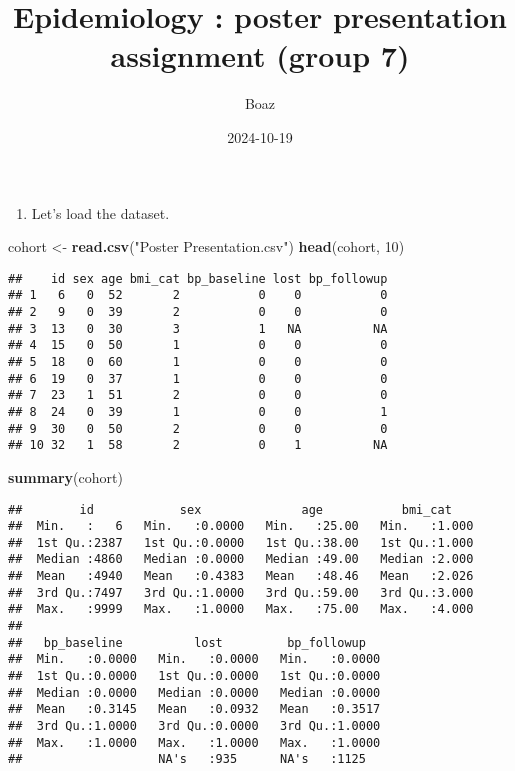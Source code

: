 \documentclass[
]{article}
\title{Epidemiology : poster presentation assignment (group 7)}
\author{Boaz}
\date{2024-10-19}
\newenvironment{Shaded}{\begin{snugshade}}{\end{snugshade}}
\newcommand{\DecValTok}[1]{\textcolor[rgb]{0.00,0.00,0.81}{#1}}
\newcommand{\FunctionTok}[1]{\textcolor[rgb]{0.13,0.29,0.53}{\textbf{#1}}}
\newcommand{\NormalTok}[1]{#1}
\newcommand{\OtherTok}[1]{\textcolor[rgb]{0.56,0.35,0.01}{#1}}
\newcommand{\StringTok}[1]{\textcolor[rgb]{0.31,0.60,0.02}{#1}}
\providecommand{\tightlist}{%
  \setlength{\itemsep}{0pt}\setlength{\parskip}{0pt}}
\begin{document}
\maketitle

\begin{enumerate}
\def\labelenumi{\arabic{enumi}.}
\tightlist
\item
  Let's load the dataset.
\end{enumerate}

\begin{Shaded}
\begin{Highlighting}[]
\NormalTok{cohort }\OtherTok{\textless{}{-}} \FunctionTok{read.csv}\NormalTok{(}\StringTok{"Poster Presentation.csv"}\NormalTok{)}
\FunctionTok{head}\NormalTok{(cohort, }\DecValTok{10}\NormalTok{)}
\end{Highlighting}
\end{Shaded}

\begin{verbatim}
##    id sex age bmi_cat bp_baseline lost bp_followup
## 1   6   0  52       2           0    0           0
## 2   9   0  39       2           0    0           0
## 3  13   0  30       3           1   NA          NA
## 4  15   0  50       1           0    0           0
## 5  18   0  60       1           0    0           0
## 6  19   0  37       1           0    0           0
## 7  23   1  51       2           0    0           0
## 8  24   0  39       1           0    0           1
## 9  30   0  50       2           0    0           0
## 10 32   1  58       2           0    1          NA
\end{verbatim}

\begin{Shaded}
\begin{Highlighting}[]
\FunctionTok{summary}\NormalTok{(cohort)}
\end{Highlighting}
\end{Shaded}

\begin{verbatim}
##        id            sex              age           bmi_cat     
##  Min.   :   6   Min.   :0.0000   Min.   :25.00   Min.   :1.000  
##  1st Qu.:2387   1st Qu.:0.0000   1st Qu.:38.00   1st Qu.:1.000  
##  Median :4860   Median :0.0000   Median :49.00   Median :2.000  
##  Mean   :4940   Mean   :0.4383   Mean   :48.46   Mean   :2.026  
##  3rd Qu.:7497   3rd Qu.:1.0000   3rd Qu.:59.00   3rd Qu.:3.000  
##  Max.   :9999   Max.   :1.0000   Max.   :75.00   Max.   :4.000  
##                                                                 
##   bp_baseline          lost         bp_followup    
##  Min.   :0.0000   Min.   :0.0000   Min.   :0.0000  
##  1st Qu.:0.0000   1st Qu.:0.0000   1st Qu.:0.0000  
##  Median :0.0000   Median :0.0000   Median :0.0000  
##  Mean   :0.3145   Mean   :0.0932   Mean   :0.3517  
##  3rd Qu.:1.0000   3rd Qu.:0.0000   3rd Qu.:1.0000  
##  Max.   :1.0000   Max.   :1.0000   Max.   :1.0000  
##                   NA's   :935      NA's   :1125
\end{verbatim}
\end{document}
